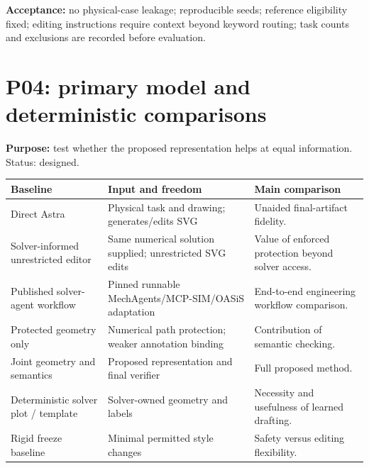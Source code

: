 \documentclass[
  11pt,
  a4paper,
]{article}
\newcounter{none} %
\begin{document}
\textbf{Acceptance:} no physical-case leakage; reproducible seeds;
reference eligibility fixed; editing instructions require context beyond
keyword routing; task counts and exclusions are recorded before
evaluation.

\section{P04: primary model and deterministic
comparisons}\label{p04-primary-model-and-deterministic-comparisons}

\textbf{Purpose:} test whether the proposed representation helps at
equal information. Status: designed.

{\def\LTcaptype{none} %
\begin{longtable}[]{@{}
  >{\raggedright\arraybackslash}p{}
  >{\raggedright\arraybackslash}p{}
  >{\raggedright\arraybackslash}p{}@{}}
\toprule\noalign{}
\begin{minipage}[b]{\linewidth}\raggedright
Baseline
\end{minipage} & \begin{minipage}[b]{\linewidth}\raggedright
Input and freedom
\end{minipage} & \begin{minipage}[b]{\linewidth}\raggedright
Main comparison
\end{minipage} \\
\midrule\noalign{}
\endhead
\bottomrule\noalign{}
\endlastfoot
Direct Astra & Physical task and drawing; generates/edits SVG & Unaided
final-artifact fidelity. \\
Solver-informed unrestricted editor & Same numerical solution supplied;
unrestricted SVG edits & Value of enforced protection beyond solver
access. \\
Published solver-agent workflow & Pinned runnable
MechAgents/MCP-SIM/OASiS adaptation & End-to-end engineering workflow
comparison. \\
Protected geometry only & Numerical path protection; weaker annotation
binding & Contribution of semantic checking. \\
Joint geometry and semantics & Proposed representation and final
verifier & Full proposed method. \\
Deterministic solver plot / template & Solver-owned geometry and labels
& Necessity and usefulness of learned drafting. \\
Rigid freeze baseline & Minimal permitted style changes & Safety versus
editing flexibility. \\
\end{longtable}
}
\end{document}
